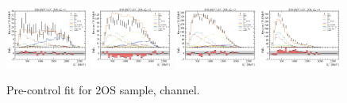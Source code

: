 \begin{figure}[htb]
    \includegraphics[width=0.24\textwidth]{./figs-supplemental-plots/pre-ctrl-fit/lines_q2_slices/fit_result-lines_q2_idx1-Dst-2os-el.pdf}
    \includegraphics[width=0.24\textwidth]{./figs-supplemental-plots/pre-ctrl-fit/lines_q2_slices/fit_result-lines_q2_idx2-Dst-2os-el.pdf}
    \includegraphics[width=0.24\textwidth]{./figs-supplemental-plots/pre-ctrl-fit/lines_q2_slices/fit_result-lines_q2_idx3-Dst-2os-el.pdf}
    \includegraphics[width=0.24\textwidth]{./figs-supplemental-plots/pre-ctrl-fit/lines_q2_slices/fit_result-lines_q2_idx4-Dst-2os-el.pdf}

    \caption{Pre-control fit for 2OS sample, \Dstar channel.}
    \label{fig:pre-ctrl-2os-dst}
\end{figure}

